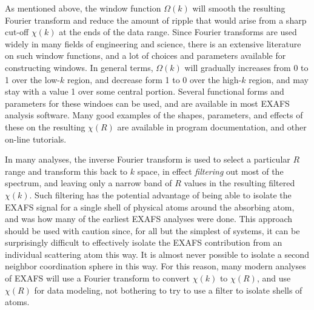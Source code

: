 As mentioned above, the window function $\Omega(k)$ will smooth the
resulting Fourier transform and reduce the amount of ripple that would
arise from a sharp cut-off $\chi(k)$ at the ends of the data range.  Since
Fourier transforms are used widely in many fields of engineering and
science, there is an extensive literature on such window functions, and a
lot of choices and parameters available for constructing windows.  In
general terms, $\Omega(k)$ will gradually increases from 0 to 1 over the
low-$k$ region, and decrease form 1 to 0 over the high-$k$ region, and may
stay with a value 1 over some central portion.  Several functional forms
and parameters for these windoes can be used, and are available in most
EXAFS analysis software.  Many good examples of the shapes, parameters, and
effects of these on the resulting $\chi(R)$ are available in program
documentation, and other on-line tutorials.

In many analyses, the inverse Fourier transform is used to select a
particular $R$ range and transform this back to $k$ space, in effect
{\emph{filtering}} out most of the spectrum, and leaving only a narrow band
of $R$ values in the resulting filtered $\chi(k)$.  Such filtering has the
potential advantage of being able to isolate the EXAFS signal for a single
shell of physical atoms around the absorbing atom, and was how many of the
earliest EXAFS analyses were done.  This approach should be used with
caution since, for all but the simplest of systems, it can be surprisingly
difficult to effectively isolate the EXAFS contribution from an individual
scattering atom this way.  It is almost never possible to isolate a second
neighbor coordination sphere in this way.  For this reason, many modern
analyses of EXAFS will use a Fourier transform to convert $\chi(k)$ to
$\chi(R)$, and use $\chi(R)$ for data modeling, not bothering to try to use
a filter to isolate shells of atoms.
